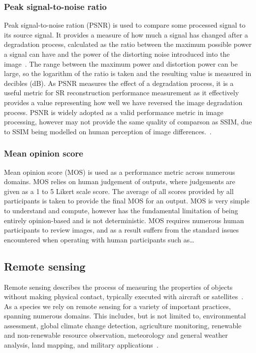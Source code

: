\subsubsection{Peak signal-to-noise ratio}
Peak signal-to-noise ration (PSNR) is used to compare some processed signal to its source signal. It provides a measure of how much a signal has changed after a degradation process, calculated as the ratio between the maximum possible power a signal can have and the power of the distorting noise introduced into the image~\cite{psnr}. The range between the maximum power and distortion power can be large, so the logarithm of the ratio is taken and the resulting value is measured in decibles (dB). As PSNR measures the effect of a degradation process, it is a useful metric for SR reconstruction performance measurement as it effectively provides a value representing how well we have reversed the image degradation process. PSNR is widely adopted as a valid performance metric in image processing, however may not provide the same quality of comparson as SSIM, due to SSIM being modelled on human perception of image differences.~\cite{psnrAnalysis}.

\subsubsection{Mean opinion score}
Mean opinion score (MOS) is used as a performance metric across numerous domains. MOS relies on human judgement of outputs, where judgements are given as a 1 to 5 Likert scale score. The average of all scores provided by all participants is taken to provide the final MOS for an output. MOS is very simple to understand and compute, however has the fundamental limitation of being entirely opinion-based and is not deterministic. MOS requires numerous human participants to review images, and as a result suffers from the standard issues encountered when operating with human participants such as\dots

\subsection{Remote sensing}
Remote sensing describes the process of measuring the properties of objects without making physical contact, typically executed with aircraft or satellites~\cite{remoteSensing,remoteSensingImageProcessing}. As a species we rely on remote sensing for a variety of important practices, spanning numerous domains. This includes, but is not limited to, environmental assessment, global climate change detection, agriculture monitoring, renewable and non-renewable resource observation, meteorology and general weather analysis, land mapping, and military applications~\cite{remoteSensingImageProcessing, remoteSensingUses, remoteSensingGANsReview}.

